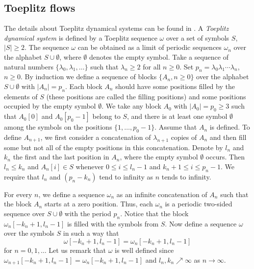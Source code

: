 \documentclass[11pt, english, reqno]{amsart}
\theoremstyle{definition}
\theoremstyle{remark}
\theoremstyle{plain}
\numberwithin{equation}{section}
\begin{document}
{\subsection{Toeplitz flows}
The details about Toeplitz dynamical systems can be found in
\cite{Williams1984, DownarowiczKwiatkowskiLacroix1995,
BulatekKwiatkowski1990, Downarowicz1990}.
A \textit{Toeplitz dynamical system} is defined by a Toeplitz sequence
$\omega$
over a set of symbols $S$, $|S| \geq 2$. The sequence $\omega$ can be
obtained as a limit of periodic sequences $\omega_n$ over the alphabet $S
\cup \emptyset$, where $\emptyset$ denotes the empty symbol. Take a
sequence of natural numbers $\{\lambda_0, \lambda_1, \ldots\}$ such that
$\lambda_n \geq 2$ for all $n \geq 0$. Set $p_n = \lambda_0 \lambda_1
\cdots \lambda_n$, $n \geq 0$. By induction we define a sequence of blocks
$\{A_n, n \geq 0\}$ over the alphabet $S \cup \emptyset$ with $|A_n| =
p_n$. Each block $A_n$ should have some positions filled by the elements of
$S$ (these positions are called the filling positions) and some positions
occupied by the empty symbol $\emptyset$.
We take any block $A_0$ with $|A_0| = p_0 \geq 3$ such that $A_0[0]$
and $A_0[p_0-1]$ belong to $S$, and there is at least one symbol $
\emptyset$ among the symbols on the positions $\{1, \ldots, p_0 - 1\}$.
Assume that $A_n$ is defined. To define $A_{n+1}$, we first consider a
concatenation of $\lambda_{n+1}$ copies of $A_n$ and then fill some but
not all of the empty positions in this concatenation. Denote by $l_n$ and
$k_n$ the first and the last position in $A_n$, where the empty symbol $
\emptyset$ occurs. Then $l_n \leq k_n$ and $A_n[i] \in S$ whenever $0
\leq i \leq l_n - 1$ and $k_n +1 \leq i \leq p_n-1$. We require that $l_n$
and $(p_n - k_n)$ tend to infinity as $n$ tends to infinity.

For every $n$, we define a sequence $\omega_n$ as an infinite
concatenation of $A_n$ such that the block $A_n$ starts at a zero position.
Thus, each $\omega_n$ is a periodic two-sided sequence over $S \cup
\emptyset$ with the period $p_n$. Notice that the block $\omega_n[-k_n +
1, l_n - 1]$ is filled with the symbols from $S$. Now define a sequence $
\omega$ over the symbols $S$ in such a way that
\begin{equation}\label{def_omega}
\omega[-k_n + 1, l_n - 1] = \omega_n[-k_n + 1, l_n - 1]
\end{equation}
for $n = 0,1, \ldots$ Let us remark that $\omega$ is well defined since $
\omega_{n+1}[-k_n + 1, l_n - 1] = \omega_{n}[-k_n + 1, l_n - 1]$ and $l_n,
k_n \nearrow \infty$ as $n \rightarrow \infty$.

}
\end{document}
